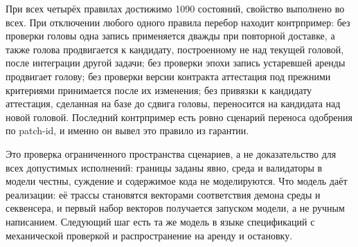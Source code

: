 При всех четырёх правилах достижимо 1090 состояний, свойство выполнено во всех. При отключении любого одного правила перебор находит контрпример: без проверки головы одна запись применяется дважды при повторной доставке, а также голова продвигается к кандидату, построенному не над текущей головой, после интеграции другой задачи; без проверки эпохи запись устаревшей аренды продвигает голову; без проверки версии контракта аттестация под прежними критериями принимается после их изменения; без привязки к кандидату аттестация, сделанная на базе до сдвига головы, переносится на кандидата над новой головой. Последний контрпример есть ровно сценарий переноса одобрения по patch-id, и именно он вывел это правило из гарантии.

\begin{warnbox}
Это проверка ограниченного пространства сценариев, а не доказательство для всех допустимых исполнений: границы заданы явно, среда и валидаторы в модели честны, суждение и содержимое кода не моделируются. Что модель даёт реализации: её трассы становятся векторами соответствия демона среды и секвенсера, и первый набор векторов получается запуском модели, а не ручным написанием. Следующий шаг есть та же модель в языке спецификаций с механической проверкой и распространение на аренду и остановку.
\end{warnbox}
